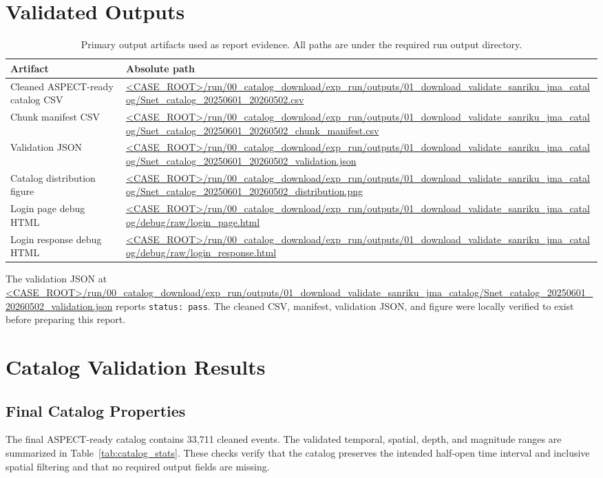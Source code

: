 \documentclass[11pt]{article}
\newcommand{\catalogcsvurl}{\url{<CASE_ROOT>/run/00_catalog_download/exp_run/outputs/01_download_validate_sanriku_jma_catalog/Snet_catalog_20250601_20260502.csv}}
\newcommand{\manifestcsvurl}{\url{<CASE_ROOT>/run/00_catalog_download/exp_run/outputs/01_download_validate_sanriku_jma_catalog/Snet_catalog_20250601_20260502_chunk_manifest.csv}}
\newcommand{\validationjsonurl}{\url{<CASE_ROOT>/run/00_catalog_download/exp_run/outputs/01_download_validate_sanriku_jma_catalog/Snet_catalog_20250601_20260502_validation.json}}
\newcommand{\distributionfigurl}{\url{<CASE_ROOT>/run/00_catalog_download/exp_run/outputs/01_download_validate_sanriku_jma_catalog/Snet_catalog_20250601_20260502_distribution.png}}
\begin{document}
\section{Validated Outputs}

\begin{table}[H]
\centering
\caption{Primary output artifacts used as report evidence. All paths are under the required run output directory.}
\label{tab:outputs}
\begin{tabularx}{\textwidth}{>{\raggedright\arraybackslash}p{}>{\raggedright\arraybackslash}X}
\toprule
Artifact & Absolute path \\
\midrule
Cleaned ASPECT-ready catalog CSV & \catalogcsvurl \\
Chunk manifest CSV & \manifestcsvurl \\
Validation JSON & \validationjsonurl \\
Catalog distribution figure & \distributionfigurl \\
Login page debug HTML & \url{<CASE_ROOT>/run/00_catalog_download/exp_run/outputs/01_download_validate_sanriku_jma_catalog/debug/raw/login_page.html} \\
Login response debug HTML & \url{<CASE_ROOT>/run/00_catalog_download/exp_run/outputs/01_download_validate_sanriku_jma_catalog/debug/raw/login_response.html} \\
\bottomrule
\end{tabularx}
\end{table}

The validation JSON at \validationjsonurl{} reports \texttt{status: pass}. The cleaned CSV, manifest, validation JSON, and figure were locally verified to exist before preparing this report.

\section{Catalog Validation Results}

\subsection{Final Catalog Properties}

The final ASPECT-ready catalog contains 33,711 cleaned events. The validated temporal, spatial, depth, and magnitude ranges are summarized in Table~\ref{tab:catalog_stats}. These checks verify that the catalog preserves the intended half-open time interval and inclusive spatial filtering and that no required output fields are missing.
\end{document}
